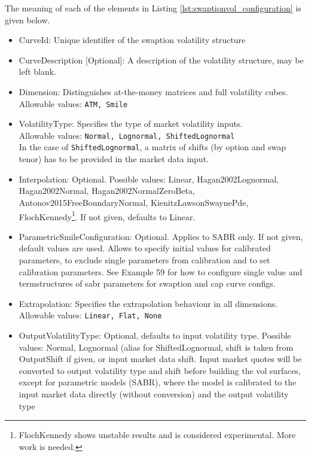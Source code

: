 The meaning of each of the elements in Listing \ref{lst:swaptionvol_configuration} is given below.

\begin{itemize}
\item CurveId: Unique identifier of the swaption volatility structure
\item CurveDescription [Optional]: A description of the volatility structure, may be left blank.
\item Dimension: Distinguishes at-the-money matrices and full volatility cubes. \\ Allowable values: {\tt ATM, Smile}
\item VolatilityType: Specifies the type of market volatility inputs. \\
Allowable values: {\tt Normal, Lognormal, ShiftedLognormal} \\
In the case of {\tt ShiftedLognormal}, a matrix of shifts (by option and swap tenor) has to be provided in the market data input.
\item Interpolation: Optional. Possible values: Linear, Hagan2002Lognormal, Hagan2002Normal, Hagan2002NormalZeroBeta,
  Antonov2015FreeBoundaryNormal, KienitzLawsonSwaynePde, FlochKennedy\footnote{FlochKennedy shows unstable results and
  is considered experimental. More work is needed.}. If not given, defaults to Linear.
\item ParametricSmileConfiguration: Optional. Applies to SABR only. If not given, default values are used. Allows to
  specify initial values for calibrated parameters, to exclude single parameters from calibration and to set calibration
  parameters. See Example 59 for how to configure single value and termstructures of sabr parameters for swaption and cap curve configs.
\item Extrapolation: Specifies the extrapolation behaviour in all dimensions. \\ Allowable values: {\tt Linear, Flat,
  None}
\item OutputVolatilityType: Optional, defaults to input volatility type. Possible values: Normal, Lognormal (alias for
  ShiftedLognormal, shift is taken from OutputShift if given, or input market data shift. Input market quotes will be
  converted to output volatility type and shift before building the vol surfaces, except for parametric models (SABR),
  where the model is calibrated to the input market data directly (without conversion) and the output volatility type

\end{itemize}
